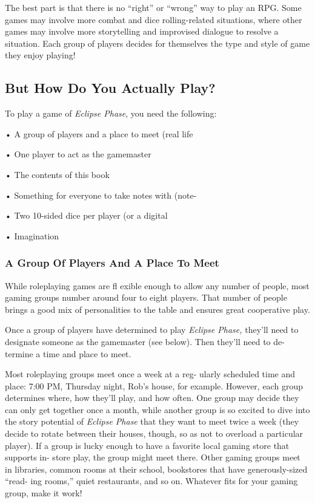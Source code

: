 The best part is that there is no ``right'' or ``wrong'' 
way to play an RPG. Some games may involve more 
combat and dice rolling-related situations, where other 
games may involve more storytelling and improvised 
dialogue to resolve a situation. Each group of players 
decides for themselves the type and style of game they 
enjoy playing!

\subsection{But How Do You Actually Play?}

To play a game of \textit{Eclipse Phase}, you need the following:

•  A group of players and a place to meet (real life 

•  One player to act as the gamemaster

•  The contents of this book

•  Something for everyone to take notes with (note-

•  Two 10-sided dice per player (or a digital 

•  Imagination

\subsubsection{A Group Of Players And A Place To Meet}

While roleplaying games are fl exible enough to allow 
any number of people, most gaming groups number 
around four to eight players. That number of people 
brings a good mix of personalities to the table and 
ensures great cooperative play.

Once a group of players have determined to play 
\textit{Eclipse Phase,} they'll need to designate someone as 
the gamemaster (see below). Then they'll need to de-
termine a time and place to meet.

Most roleplaying groups meet once a week at a reg-
ularly scheduled time and place: 7:00 PM, Thursday 
night, Rob's house, for example. However, each group 
determines where, how they'll play, and how often. 
One group may decide they can only get together 
once a month, while another group is so excited to 
dive into the story potential of \textit{Eclipse Phase} that 
they want to meet twice a week (they decide to rotate 
between their houses, though, so as not to overload 
a particular player). If a group is lucky enough to 
have a favorite local gaming store that supports in-
store play, the group might meet there. Other gaming 
groups meet in libraries, common rooms at their 
school, bookstores that have generously-sized ``read-
ing rooms,'' quiet restaurants, and so on. Whatever 
fits for your gaming group, make it work!

